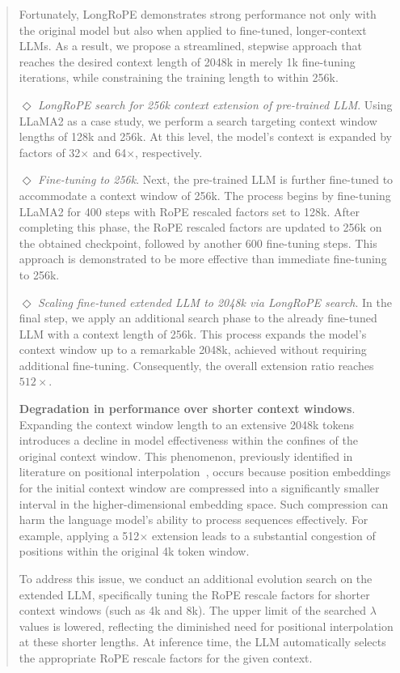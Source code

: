 \begin{abstract}
Fortunately, LongRoPE demonstrates strong performance not only with the original model but also when applied to fine-tuned, longer-context LLMs. As a result, we propose a streamlined, stepwise approach that reaches the desired context length of 2048k in merely 1k fine-tuning iterations, while constraining the training length to within 256k.

$\Diamond$ \textit{LongRoPE search for 256k context extension of pre-trained LLM}. Using LLaMA2 as a case study, we perform a search targeting context window lengths of 128k and 256k. At this level, the model’s context is expanded by factors of 32$\times$ and 64$\times$, respectively.

$\Diamond$ \textit{Fine-tuning to 256k}. Next, the pre-trained LLM is further fine-tuned to accommodate a context window of 256k. The process begins by fine-tuning LLaMA2 for 400 steps with RoPE rescaled factors set to 128k. After completing this phase, the RoPE rescaled factors are updated to 256k on the obtained checkpoint, followed by another 600 fine-tuning steps. This approach is demonstrated to be more effective than immediate fine-tuning to 256k.

$\Diamond$ \textit{Scaling fine-tuned extended LLM to 2048k via LongRoPE search}. In the final step, we apply an additional search phase to the already fine-tuned LLM with a context length of 256k. This process expands the model's context window up to a remarkable 2048k, achieved without requiring additional fine-tuning. Consequently, the overall extension ratio reaches $512\times$.

\textbf{Degradation in performance over shorter context windows}. Expanding the context window length to an extensive 2048k tokens introduces a decline in model effectiveness within the confines of the original context window. This phenomenon, previously identified in literature on positional interpolation~\cite{pi}, occurs because position embeddings for the initial context window are compressed into a significantly smaller interval in the higher-dimensional embedding space. Such compression can harm the language model's ability to process sequences effectively. For example, applying a 512$\times$ extension leads to a substantial congestion of positions within the original 4k token window.

To address this issue, we conduct an additional evolution search on the extended LLM, specifically tuning the RoPE rescale factors for shorter context windows (such as 4k and 8k). The upper limit of the searched $\lambda$ values is lowered, reflecting the diminished need for positional interpolation at these shorter lengths. At inference time, the LLM automatically selects the appropriate RoPE rescale factors for the given context.


\end{abstract}
